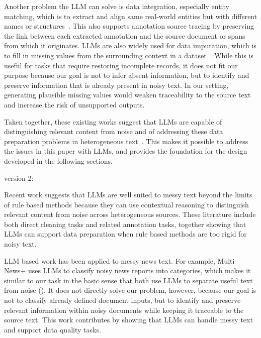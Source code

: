 \documentclass{article}
\begin{document}
Another problem the LLM can solve is data integration, especially entity matching, which is to extract and align same real-world entities but with different names or structures~\cite{Peeters_etal2025,Wang_etal2025,Fan_etal2024}. This also supports annotation source tracing by preserving the link between each extracted annotation and the source document or spans from which it originates. LLMs are also widely used for data imputation, which is to fill in missing values from the surrounding context in a dataset~\cite{Ding_etal2024,He_etal2025}. While this is useful for tasks that require restoring incomplete records, it does not fit our purpose because our goal is not to infer absent information, but to identify and preserve information that is already present in noisy text. In our setting, generating plausible missing values would weaken traceability to the source text and increase the risk of unsupported outputs.

Taken together, these existing works suggest that LLMs are capable of distinguishing relevant content from noise and of addressing these data preparation problems in heterogeneous text~\cite{Zhou_etal2026}. This makes it possible to address the issues in this paper with LLMs, and provides the foundation for the design developed in the following sections.

version 2:

Recent work suggests that LLMs are well suited to messy text beyond the limits of rule based methods because they can use contextual reasoning to distinguish relevant content from noise across heterogeneous sources. These literature include both direct cleaning tasks and related annotation tasks, together showing that LLMs can support data preparation when rule based methods are too rigid for noisy text.

LLM based work has been applied to messy news text. For example, Multi-News+ uses LLMs to classify noisy news reports into categories, which makes it similar to our task in the basic sense that both use LLMs to separate useful text from noise (\cite{Choi_etal2024}). It does not directly solve our problem, however, because our goal is not to classify already defined document inputs, but to identify and preserve relevant information within noisy documents while keeping it traceable to the source text. This work contributes by showing that LLMs can handle messy text and support data quality tasks.
\end{document}

